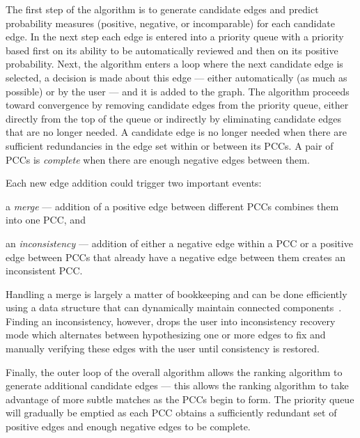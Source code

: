 The first step of the algorithm is to generate candidate edges and predict probability measures (positive,
  negative, or incomparable) for each candidate edge.
In the next step each edge is entered into a priority queue with a priority based first on its ability to be
  automatically reviewed and then on its positive probability.
Next, the algorithm enters a loop where the next candidate edge is selected, a decision is made about this edge
  --- either automatically (as much as possible) or by the user --- and it is added to the graph.
The algorithm proceeds toward convergence by removing candidate edges from the priority queue, either directly
  from the top of the queue or indirectly by eliminating candidate edges that are no longer needed.
A candidate edge is no longer needed when there are sufficient redundancies in the edge set within or between its
  PCCs.
A pair of PCCs is \emph{complete} when there are enough negative edges between them.

Each new edge addition could trigger two important events:
\begin{enumin}
    \item a \emph{merge} --- addition of a positive edge between different
      PCCs combines them into one PCC, and

    \item an \emph{inconsistency} --- addition of either a negative edge within a PCC or a positive edge between
      PCCs that already have a negative edge between them creates an inconsistent PCC.
\end{enumin}
Handling a merge is largely a matter of bookkeeping and can be done efficiently using a data structure that can
  dynamically maintain connected components~\cite{jacob_holm_poly_logarithmic_2001}.
Finding an inconsistency, however, drops the user into inconsistency recovery mode which alternates between
  hypothesizing one or more edges to fix and manually verifying these edges with the user until consistency is
  restored.

Finally, the outer loop of the overall algorithm allows the ranking algorithm to generate additional candidate
  edges --- this allows the ranking algorithm to take advantage of more subtle matches as the PCCs begin to form.
The priority queue will gradually be emptied as each PCC obtains a sufficiently redundant set of positive edges
  and enough negative edges to be complete.

